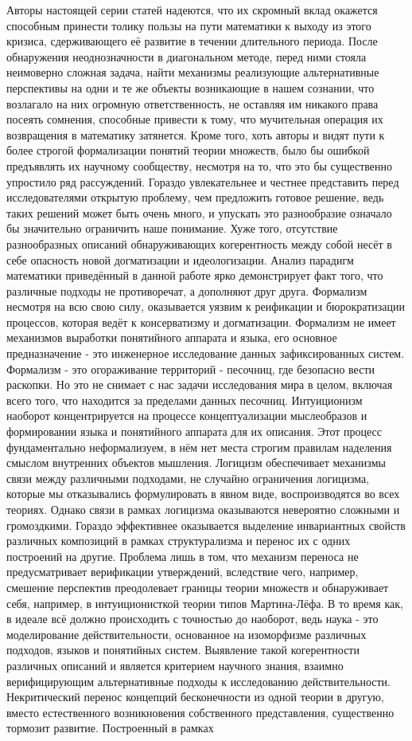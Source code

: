 \documentclass[12pt]{article}
\begin{document}
Авторы настоящей серии статей надеются, что их скромный вклад окажется способным принести толику пользы на пути математики к выходу из этого кризиса, сдерживающего её развитие в течении длительного периода. После обнаружения неоднозначности в диагональном методе, перед ними стояла неимоверно сложная задача, найти механизмы реализующие альтернативные перспективы на одни и те же объекты возникающие в нашем сознании, что возлагало на них огромную ответственность, не оставляя им никакого права посеять сомнения, способные привести к тому, что мучительная операция их возвращения в математику затянется. Кроме того, хоть авторы и видят пути к более строгой формализации понятий теории множеств, было бы ошибкой предъявлять их научному сообществу, несмотря на то, что это бы существенно упростило ряд рассуждений. Гораздо увлекательнее и честнее представить перед исследователями открытую проблему, чем предложить готовое решение, ведь таких решений может быть очень много, и упускать это разнообразие означало бы значительно ограничить наше понимание. Хуже того, отсутствие разнообразных описаний обнаруживающих когерентность между собой несёт в себе опасность новой догматизации и идеологизации. Анализ парадигм математики приведённый в данной работе ярко демонстрирует факт того, что различные подходы не противоречат, а дополняют друг друга. Формализм несмотря на всю свою силу, оказывается уязвим к реификации и бюрократизации процессов, которая ведёт к консерватизму и догматизации. Формализм не имеет механизмов выработки понятийного аппарата и языка, его основное предназначение - это инженерное исследование данных зафиксированных систем. Формализм - это огораживание территорий - песочниц, где безопасно вести раскопки. Но это не снимает с нас задачи исследования мира в целом, включая всего того, что находится за пределами данных песочниц. Интуиционизм наоборот концентрируется на процессе концептуализации  мыслеобразов и формировании языка и понятийного аппарата для их описания. Этот процесс фундаментально неформализуем, в нём нет места строгим правилам наделения смыслом внутренних объектов мышления. Логицизм обеспечивает механизмы связи между различными подходами, не случайно ограничения логицизма, которые мы отказывались формулировать в явном виде, воспроизводятся во всех теориях. Однако связи в рамках логицизма оказываются невероятно сложными и громоздкими. Гораздо эффективнее оказывается выделение инвариантных свойств различных композиций в рамках структурализма и перенос их с одних построений на другие. Проблема лишь в том, что механизм переноса не предусматривает верификации утверждений, вследствие чего, например, смешение перспектив преодолевает границы теории множеств и обнаруживает себя, например, в интуиционисткой теории типов Мартина-Лёфа. В то время как, в идеале всё должно происходить с точностью до наоборот, ведь наука - это моделирование действительности, основанное на изоморфизме различных подходов, языков и понятийных систем. Выявление такой когерентности различных описаний и является критерием научного знания, взаимно верифицирующим альтернативные подходы к исследованию действительности. Некритический перенос концепций бесконечности из одной теории в другую, вместо естественного возникновения собственного представления, существенно тормозит развитие. Построенный в рамках 
\end{document}
